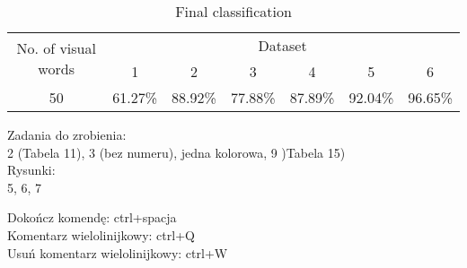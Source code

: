 \documentclass{article}
\begin{document}
\begin{table}
	\centering
		\begin{tabular}{|c|c|c|c|c|c|c|}
		\hline
		\multirow{2}{*}{No. of visual words} & \multicolumn{6}{c|}{Dataset} \\ \cline{2-7}
			& 1 & 2 & 3 & 4 & 5 & 6 \\ \hline
			50 & 61.27\% & 88.92\% &77.88\%& 87.89\%& 92.04\% & 96.65\% \\ \hline
		\end{tabular}
	\caption{Final classification}
	\label{tab:Final}
\end{table}



Zadania do zrobienia: \\
2 (Tabela 11), 3 (bez numeru), jedna kolorowa, 9 )Tabela 15)\\

Rysunki: \\
5, 6, 7

Dokończ komendę: ctrl+spacja\\
Komentarz wielolinijkowy: ctrl+Q\\
Usuń komentarz wielolinijkowy: ctrl+W\\
\end{document}
